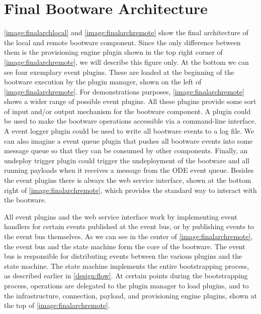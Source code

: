 \section{Final Bootware Architecture}
\label{design:finalarch}

\autoref{image:finalarchlocal} and \autoref{image:finalarchremote} show the final architecture of the local and remote bootware component.
Since the only difference between them is the provisioning engine plugin shown in the top right corner of \autoref{image:finalarchremote}, we will describe this figure only.
At the bottom we can see four exemplary event plugins.
These are loaded at the beginning of the bootware execution by the plugin manager, shown on the left of \autoref{image:finalarchremote}.
For demonstrations purposes, \autoref{image:finalarchremote} shows a wider range of possible event plugins.
All these plugins provide some sort of input and/or output mechanism for the bootware component.
A  plugin could be used to make the bootware operations accessible via a command-line interface.
A event logger plugin could be used to write all bootware events to a log file.
We can also imagine a event queue plugin that pushes all bootware events into some message queue so that they can be consumed by other components.
Finally, an undeploy trigger plugin could trigger the undeployment of the bootware and all running payloads when it receives a message from the ODE event queue.
Besides the event plugins there is always the web service interface, shown at the bottom right of \autoref{image:finalarchremote}, which provides the standard way to interact with the bootware.

All event plugins and the web service interface work by implementing event handlers for certain events published at the event bus, or by publishing events to the event bus themselves.
As we can see in the center of \autoref{image:finalarchremote}, the event bus and the state machine form the core of the bootware.
The event bus is responsible for distributing events between the various plugins and the state machine.
The state machine implements the entire bootstrapping process, as described earlier in \autoref{design:flow}.
At certain points during the bootstrapping process, operations are delegated to the plugin manager to load plugins, and to the infrastructure, connection, payload, and provisioning engine plugins, shown at the top of \autoref{image:finalarchremote}.

